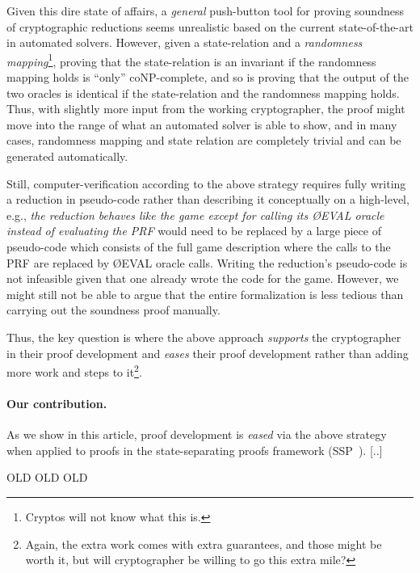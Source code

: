 Given this dire state of affairs, a \emph{general} push-button tool for proving soundness of cryptographic reductions seems unrealistic based on the current state-of-the-art in automated solvers. However, given a state-relation and a \emph{randomness mapping}\footnote{Cryptos will not know what this is.}, proving that the state-relation is an invariant if the randomness mapping holds is ``only'' coNP-complete, and so is proving that the output of the two oracles is identical if the state-relation and the randomness mapping holds. Thus, with slightly more input from the working cryptographer, the proof might move into the range of what an automated solver is able to show, and in many cases, randomness mapping and state relation are completely trivial and can be generated automatically.

Still, computer-verification according to the above strategy requires fully writing a reduction in pseudo-code rather than describing it conceptually on a high-level, e.g., \emph{the reduction behaves like the game except for calling its \O{EVAL} oracle instead of evaluating the PRF} would need
to be replaced by a large piece of pseudo-code which consists of the full game description where the calls to the PRF are replaced by \O{EVAL} oracle calls.
Writing the reduction's pseudo-code is not infeasible given that one already
wrote the code for the game. However, we might still not be able to argue that 
the entire formalization is less tedious than carrying out the soundness proof manually.

Thus, the key question is where the above approach \emph{supports} the cryptographer
in their proof development and \emph{eases} their proof development rather than adding more work and steps to it\footnote{Again, the extra work comes with extra guarantees, and those might be worth it, but will cryptographer be willing to go this extra mile?}.

\paragraph{Our contribution.} As we show in this article, proof development is \emph{eased} via the above strategy when applied to proofs in the state-separating proofs framework (SSP~\cite{X}). [..]

\iffalse
\clearpage
OLD OLD OLD



